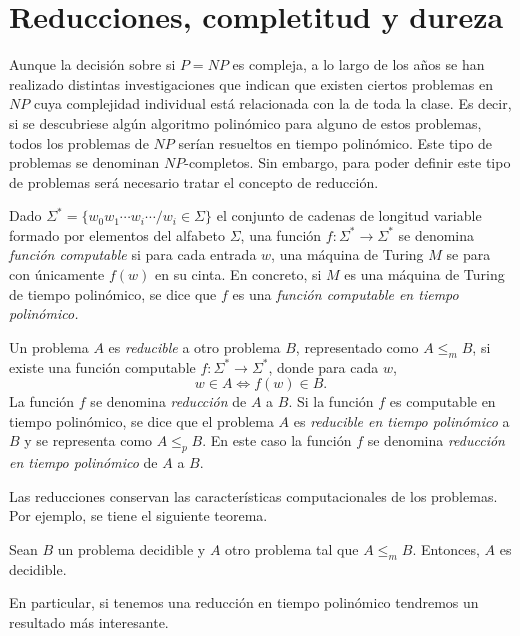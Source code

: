 \section{Reducciones, completitud y dureza}
Aunque la decisión sobre si $P=NP$ es compleja, a lo largo de los años se han realizado distintas investigaciones que indican que existen ciertos problemas en $NP$ cuya complejidad individual está relacionada con la de toda la clase. Es decir, si se descubriese algún algoritmo polinómico para alguno de estos problemas, todos los problemas de $NP$ serían resueltos en tiempo polinómico. Este tipo de problemas se denominan $NP$-completos. Sin embargo, para poder definir este tipo de problemas será necesario tratar el concepto de reducción.

\begin{definition}
    Dado $\Sigma^*=\{w_0w_1\cdots w_i\cdots/w_i\in\Sigma\}$ el conjunto de cadenas de longitud variable formado por elementos del alfabeto $\Sigma$, una función $f:\Sigma^*\rightarrow\Sigma^*$ se denomina \textit{función computable} si para cada entrada $w$, una máquina de Turing $M$ se para con únicamente $f(w)$ en su cinta. En concreto, si $M$ es una máquina de Turing de tiempo polinómico, se dice que $f$ es una \textit{función computable en tiempo polinómico.}
\end{definition}

\begin{definition}
    Un problema $A$ es \textit{reducible} a otro problema $B$, representado como $A\leq_m B$, si existe una función computable $f:\Sigma^*\rightarrow\Sigma^*$, donde para cada $w$,
    $$w\in A \iff f(w)\in B.$$
    La función $f$ se denomina \textit{reducción} de $A$ a $B$. Si la función $f$ es computable en tiempo polinómico, se dice que el problema $A$ es \textit{reducible en tiempo polinómico} a $B$ y se representa como $A\leq_pB$. En este caso la función $f$ se denomina \textit{reducción en tiempo polinómico} de $A$ a $B$.
\end{definition}

Las reducciones conservan las características computacionales de los problemas. Por ejemplo, se tiene el siguiente teorema.

\begin{theorem}
    Sean $B$ un problema decidible y $A$ otro problema tal que $A\leq_mB$. Entonces, $A$ es decidible.
\end{theorem}

En particular, si tenemos una reducción en tiempo polinómico tendremos un resultado más interesante.

